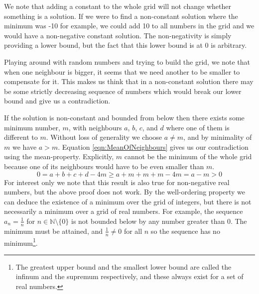 \begin{solution}

	We note that adding a constant to the whole grid will not change whether something is a solution. If we were to find a non-constant solution where the minimum was -10 for example, we could add 10 to all numbers in the grid and we would have a non-negative constant solution. The non-negativity is simply providing a lower bound, but the fact that this lower bound is at 0 is arbitrary.
	
	Playing around with random numbers and trying to build the grid, we note that when one neighbour is bigger, it seems that we need another to be smaller to compensate for it. This makes us think that in a non-constant solution there may be some strictly decreasing sequence of numbers which would break our lower bound and give us a contradiction.
	
	If the solution is non-constant and bounded from below then there exists some minimum number, $m$, with neighbours $a$, $b$, $c$, and $d$ where one of them is different to $m$. Without loss of generality we choose $a \ne m$, and by minimality of $m$ we have $a > m$. Equation \eqref{eqn:MeanOfNeighbours} gives us our contradiction using the mean-property. Explicitly, $m$ cannot be the minimum of the whole grid because one of its neighbours would have to be even smaller than $m$.
	\begin{equation}
		0 = a + b + c + d - 4m \geq a + m + m + m - 4m	= a - m > 0
		\label{eqn:MeanOfNeighbours}
	\end{equation}
	For interest only we note that this result is also true for non-negative real numbers, but the above proof does not work. By the well-ordering property we can deduce the existence of a minimum over the grid of integers, but there is not necessarily a minimum over a grid of real numbers. For example, the sequence $a_n = \frac{1}{n}$ for $n \in \mathbb{N} \setminus \{0\}$ is not bounded below by any number greater than 0. The minimum must be attained, and $\frac{1}{n} \ne 0$ for all $n$ so the sequence has no minimum\footnote{The greatest upper bound and the smallest lower bound are called the infinum and the supremum respectively, and these always exist for a set of real numbers.}.

\end{solution}